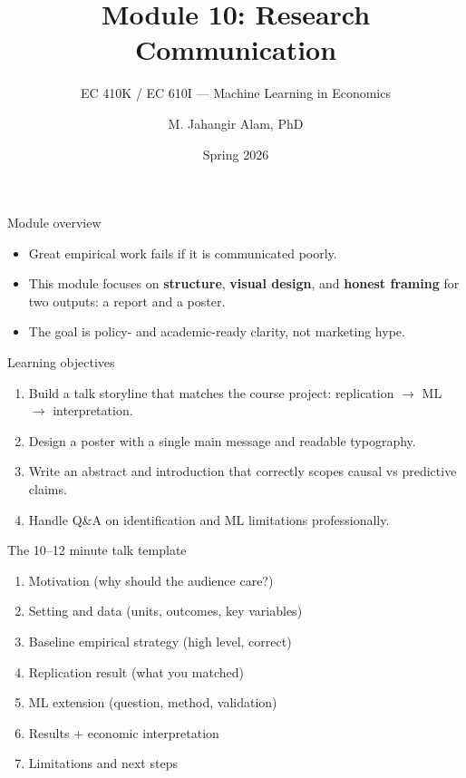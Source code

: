 \documentclass[aspectratio=169,11pt]{beamer}
\title[Communication]{Module 10: Research Communication}
\subtitle{EC 410K / EC 610I --- Machine Learning in Economics}
\author{M. Jahangir Alam, PhD}
\institute{Wilfrid Laurier University}
\date{Spring 2026}
\begin{document}
\begin{frame}[plain]
  \titlepage
\end{frame}

\begin{frame}{Module overview}
  \begin{itemize}
    \item Great empirical work fails if it is communicated poorly.
    \item This module focuses on \textbf{structure}, \textbf{visual design}, and \textbf{honest framing} for two outputs: a report and a poster.
    \item The goal is policy- and academic-ready clarity, not marketing hype.
  \end{itemize}
\end{frame}

\begin{frame}{Learning objectives}
  \begin{enumerate}
    \item Build a talk storyline that matches the course project: replication \(\rightarrow\) ML \(\rightarrow\) interpretation.
    \item Design a poster with a single main message and readable typography.
    \item Write an abstract and introduction that correctly scopes causal vs predictive claims.
    \item Handle Q\&A on identification and ML limitations professionally.
  \end{enumerate}
\end{frame}

\begin{frame}{The 10--12 minute talk template}
  \begin{enumerate}
    \item Motivation (why should the audience care?)
    \item Setting and data (units, outcomes, key variables)
    \item Baseline empirical strategy (high level, correct)
    \item Replication result (what you matched)
    \item ML extension (question, method, validation)
    \item Results + economic interpretation
    \item Limitations and next steps
  \end{enumerate}
\end{frame}
\end{document}
